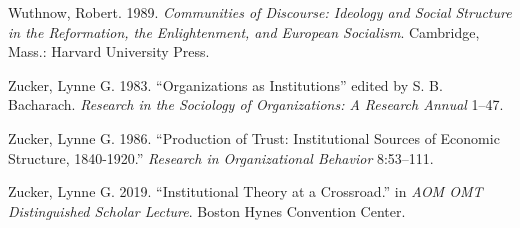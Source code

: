 \documentclass[]{book}
\theoremstyle{definition}
\theoremstyle{definition}
\theoremstyle{definition}
\theoremstyle{remark}
\begin{document}
\leavevmode\hypertarget{ref-Wuthnow1989Communities}{}%
Wuthnow, Robert. 1989. \emph{Communities of Discourse: Ideology and
Social Structure in the Reformation, the Enlightenment, and European
Socialism}. Cambridge, Mass.: Harvard University Press.

\leavevmode\hypertarget{ref-Zucker1983Organizations}{}%
Zucker, Lynne G. 1983. ``Organizations as Institutions'' edited by S. B.
Bacharach. \emph{Research in the Sociology of Organizations: A Research
Annual} 1--47.

\leavevmode\hypertarget{ref-Zucker1986Production}{}%
Zucker, Lynne G. 1986. ``Production of Trust: Institutional Sources of
Economic Structure, 1840-1920.'' \emph{Research in Organizational
Behavior} 8:53--111.

\leavevmode\hypertarget{ref-Zucker2019Institutional}{}%
Zucker, Lynne G. 2019. ``Institutional Theory at a Crossroad.'' in
\emph{AOM OMT Distinguished Scholar Lecture}. Boston Hynes Convention
Center.
\end{document}
